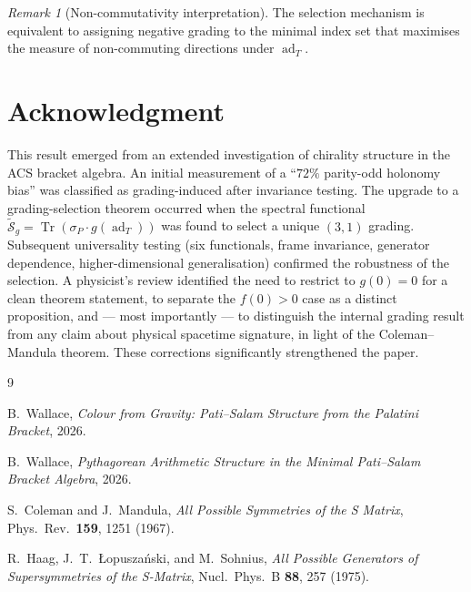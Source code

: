 \documentclass[11pt]{article}
\theoremstyle{plain}
\theoremstyle{definition}
\theoremstyle{remark}
\newtheorem*{remark}{Remark}
\newcommand{\ad}{\operatorname{ad}}
\newcommand{\Tr}{\operatorname{Tr}}
\begin{document}
\begin{remark}[Non-commutativity interpretation]
The selection mechanism is equivalent to assigning negative
grading to the minimal index set that maximises the measure of
non-commuting directions under $\ad_T$.
\end{remark}

\section*{Acknowledgment}

This result emerged from an extended investigation of chirality
structure in the ACS bracket algebra.  An initial measurement of a
``$72\%$ parity-odd holonomy bias'' was classified as
grading-induced after invariance testing.  The upgrade to a
grading-selection theorem occurred when the spectral functional
$\widetilde{\mathcal{S}}_g = \Tr(\sigma_P \cdot g(\ad_T))$ was
found to select a unique $(3,1)$ grading.  Subsequent universality
testing (six functionals, frame invariance, generator dependence,
higher-dimensional generalisation) confirmed the robustness of the
selection.  A physicist's review identified the need to restrict to
$g(0) = 0$ for a clean theorem statement, to separate the $f(0) > 0$
case as a distinct proposition, and --- most importantly --- to
distinguish the internal grading result from any claim about
physical spacetime signature, in light of the Coleman--Mandula
theorem.  These corrections significantly strengthened the paper.

\begin{thebibliography}{9}

B.~Wallace,
\textit{Colour from Gravity: Pati--Salam Structure from the Palatini
Bracket},
2026.

B.~Wallace,
\textit{Pythagorean Arithmetic Structure in the Minimal Pati--Salam
Bracket Algebra},
2026.

S.~Coleman and J.~Mandula,
\textit{All Possible Symmetries of the S Matrix},
Phys.\ Rev.\ \textbf{159}, 1251 (1967).

R.~Haag, J.~T.~{\L}opusza\'{n}ski, and M.~Sohnius,
\textit{All Possible Generators of Supersymmetries of the S-Matrix},
Nucl.\ Phys.\ B \textbf{88}, 257 (1975).

\end{thebibliography}
\end{document}
